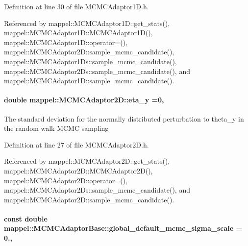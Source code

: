 Definition at line 30 of file M\+C\+M\+C\+Adaptor1\+D.\+h.



Referenced by mappel\+::\+M\+C\+M\+C\+Adaptor1\+D\+::get\+\_\+stats(), mappel\+::\+M\+C\+M\+C\+Adaptor1\+D\+::\+M\+C\+M\+C\+Adaptor1\+D(), mappel\+::\+M\+C\+M\+C\+Adaptor1\+D\+::operator=(), mappel\+::\+M\+C\+M\+C\+Adaptor2\+D\+::sample\+\_\+mcmc\+\_\+candidate(), mappel\+::\+M\+C\+M\+C\+Adaptor1\+Ds\+::sample\+\_\+mcmc\+\_\+candidate(), mappel\+::\+M\+C\+M\+C\+Adaptor2\+Ds\+::sample\+\_\+mcmc\+\_\+candidate(), and mappel\+::\+M\+C\+M\+C\+Adaptor1\+D\+::sample\+\_\+mcmc\+\_\+candidate().

\paragraph[{\texorpdfstring{eta\+\_\+y}{eta_y}}]{\setlength{\rightskip}{0pt plus 5cm}double mappel\+::\+M\+C\+M\+C\+Adaptor2\+D\+::eta\+\_\+y =0\hspace{0.3cm}{\ttfamily [protected]}, {\ttfamily [inherited]}}\hypertarget{classmappel_1_1MCMCAdaptor2D_a8e49652147538fe2a12943522f1a8b30}{}\label{classmappel_1_1MCMCAdaptor2D_a8e49652147538fe2a12943522f1a8b30}
The standard deviation for the normally distributed perturbation to theta\+\_\+y in the random walk M\+C\+MC sampling 

Definition at line 27 of file M\+C\+M\+C\+Adaptor2\+D.\+h.



Referenced by mappel\+::\+M\+C\+M\+C\+Adaptor2\+D\+::get\+\_\+stats(), mappel\+::\+M\+C\+M\+C\+Adaptor2\+D\+::\+M\+C\+M\+C\+Adaptor2\+D(), mappel\+::\+M\+C\+M\+C\+Adaptor2\+D\+::operator=(), mappel\+::\+M\+C\+M\+C\+Adaptor2\+Ds\+::sample\+\_\+mcmc\+\_\+candidate(), and mappel\+::\+M\+C\+M\+C\+Adaptor2\+D\+::sample\+\_\+mcmc\+\_\+candidate().

\paragraph[{\texorpdfstring{global\+\_\+default\+\_\+mcmc\+\_\+sigma\+\_\+scale}{global_default_mcmc_sigma_scale}}]{\setlength{\rightskip}{0pt plus 5cm}const double mappel\+::\+M\+C\+M\+C\+Adaptor\+Base\+::global\+\_\+default\+\_\+mcmc\+\_\+sigma\+\_\+scale = 0.\hspace{0.3cm}{\ttfamily [static]}, {\ttfamily [inherited]}}\hypertarget{classmappel_1_1MCMCAdaptorBase_a44cebca0e27135c854fa8430d2d89929}{}\label{classmappel_1_1MCMCAdaptorBase_a44cebca0e27135c854fa8430d2d89929}


